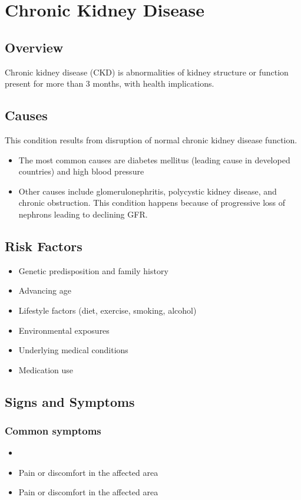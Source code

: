 \chapter{Chronic Kidney Disease}
\label{sec:Chronic Kidney Disease}

\section{Overview}
Chronic kidney disease (CKD) is abnormalities of kidney structure or function present for more than 3 months, with health implications.
\section{Causes}
This condition results from disruption of normal chronic kidney disease function.

\begin{itemize}[noitemsep]
  \item The most common causes are diabetes mellitus (leading cause in developed countries) and high blood pressure
  \item Other causes include glomerulonephritis, polycystic kidney disease, and chronic obstruction. This condition happens because of progressive loss of nephrons leading to declining GFR.
\end{itemize}
\section{Risk Factors}


\begin{itemize}[noitemsep]
  \item Genetic predisposition and family history
  \item Advancing age
  \item Lifestyle factors (diet, exercise, smoking, alcohol)
  \item Environmental exposures
  \item Underlying medical conditions
  \item Medication use
\end{itemize}
\section{Signs and Symptoms}

\subsection{Common symptoms}
\begin{itemize}[noitemsep]
  \item \item Pain or discomfort in the affected area    \item Pain or discomfort in the affected area
  \end{itemize}

